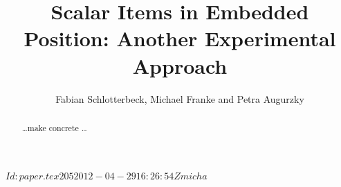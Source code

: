 \documentclass[fleqn,reqno,10pt]{article}
\title{Scalar Items in Embedded Position: {A}nother Experimental Approach}
\author{Fabian Schlotterbeck, Michael Franke and Petra Augurzky}
\date{}
\begin{document}
\maketitle


\begin{abstract}
  \dots make concrete \dots
\end{abstract}

\svnInfo $Id: paper.tex 205 2012-04-29 16:26:54Z micha $


\printbibliography[heading=bibintoc]
\end{document}
